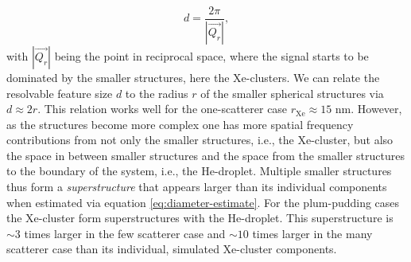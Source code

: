 \begin{equation}
d = \frac{2\pi}{\left|\vec{Q_{r}}\right|},
\label{eq:diameter-estimate}
\end{equation}
with $\left|\vec{Q_{r}}\right|$ being the point in reciprocal space, where the signal starts to be dominated by the smaller structures, here the Xe-clusters. We can relate the resolvable feature size $d$ to the radius $r$ of the smaller spherical structures via $d\approx 2 r$. This relation works well for the one-scatterer case $r_{\text{Xe}}\approx 15$ nm. However, as the structures become more complex one has more spatial frequency contributions from not only the smaller structures, i.e., the Xe-cluster, but also the space in between smaller structures and the space from the smaller structures to the boundary of the system, i.e., the He-droplet. Multiple smaller structures thus form a \textit{superstructure} that appears larger than its individual components when estimated via equation \eqref{eq:diameter-estimate}. For the plum-pudding cases the Xe-cluster form superstructures with the He-droplet. This superstructure is $\sim 3$ times larger in the few scatterer case and $\sim 10$ times larger in the many scatterer case than its individual, simulated Xe-cluster components.\\
